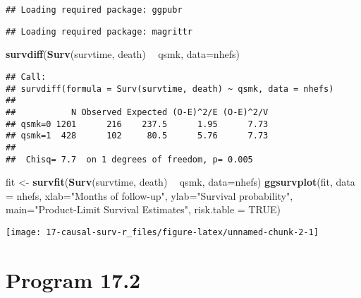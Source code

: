 \documentclass[10pt,]{book}
\newenvironment{Shaded}{\begin{snugshade}}{\end{snugshade}}
\newcommand{\DataTypeTok}[1]{\textcolor[rgb]{0.13,0.29,0.53}{#1}}
\newcommand{\KeywordTok}[1]{\textcolor[rgb]{0.13,0.29,0.53}{\textbf{#1}}}
\newcommand{\NormalTok}[1]{#1}
\newcommand{\OperatorTok}[1]{\textcolor[rgb]{0.81,0.36,0.00}{\textbf{#1}}}
\newcommand{\OtherTok}[1]{\textcolor[rgb]{0.56,0.35,0.01}{#1}}
\newcommand{\StringTok}[1]{\textcolor[rgb]{0.31,0.60,0.02}{#1}}
\begin{document}
\begin{verbatim}
## Loading required package: ggpubr
\end{verbatim}

\begin{verbatim}
## Loading required package: magrittr
\end{verbatim}

\begin{Shaded}
\begin{Highlighting}[]
\KeywordTok{survdiff}\NormalTok{(}\KeywordTok{Surv}\NormalTok{(survtime, death) }\OperatorTok{~}\StringTok{ }\NormalTok{qsmk, }\DataTypeTok{data=}\NormalTok{nhefs)}
\end{Highlighting}
\end{Shaded}

\begin{verbatim}
## Call:
## survdiff(formula = Surv(survtime, death) ~ qsmk, data = nhefs)
## 
##           N Observed Expected (O-E)^2/E (O-E)^2/V
## qsmk=0 1201      216    237.5      1.95      7.73
## qsmk=1  428      102     80.5      5.76      7.73
## 
##  Chisq= 7.7  on 1 degrees of freedom, p= 0.005
\end{verbatim}

\begin{Shaded}
\begin{Highlighting}[]
\NormalTok{fit <-}\StringTok{ }\KeywordTok{survfit}\NormalTok{(}\KeywordTok{Surv}\NormalTok{(survtime, death) }\OperatorTok{~}\StringTok{ }\NormalTok{qsmk, }\DataTypeTok{data=}\NormalTok{nhefs)}
\KeywordTok{ggsurvplot}\NormalTok{(fit, }\DataTypeTok{data =}\NormalTok{ nhefs, }\DataTypeTok{xlab=}\StringTok{"Months of follow-up"}\NormalTok{,}
           \DataTypeTok{ylab=}\StringTok{"Survival probability"}\NormalTok{,}
           \DataTypeTok{main=}\StringTok{"Product-Limit Survival Estimates"}\NormalTok{, }\DataTypeTok{risk.table =} \OtherTok{TRUE}\NormalTok{)}
\end{Highlighting}
\end{Shaded}

\begin{center}\texttt{[image: 17-causal-surv-r\_files/figure-latex/unnamed-chunk-2-1]} \end{center}

\hypertarget{program-17.2}{%
\section{Program 17.2}\label{program-17.2}}
\end{document}
